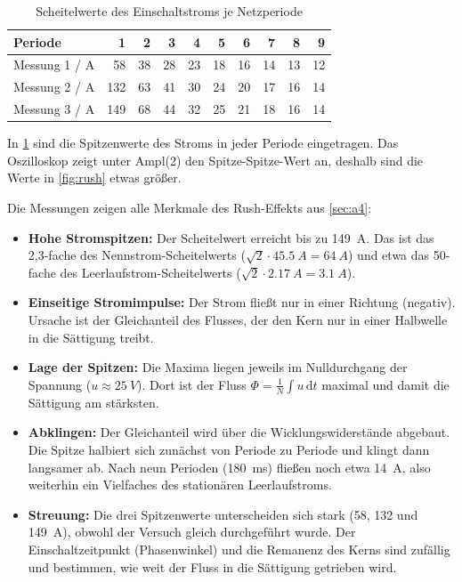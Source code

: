 \documentclass[a4paper,11pt]{scrreprt}
\begin{document}
\begin{table}[H]
\centering
\caption{Scheitelwerte des Einschaltstroms je Netzperiode}
\label{tab:rush}
\begin{tabular}{@{}lrrrrrrrrr@{}}
\toprule
Periode & 1 & 2 & 3 & 4 & 5 & 6 & 7 & 8 & 9\\
\midrule
Messung 1 / A & 58 & 38 & 28 & 23 & 18 & 16 & 14 & 13 & 12\\
Messung 2 / A & 132 & 63 & 41 & 30 & 24 & 20 & 17 & 16 & 14\\
Messung 3 / A & 149 & 68 & 44 & 32 & 25 & 21 & 18 & 16 & 14\\
\bottomrule
\end{tabular}
\end{table}

In \cref{tab:rush} sind die Spitzenwerte des Stroms in jeder Periode eingetragen. Das Oszilloskop zeigt unter \glqq Ampl(2)\grqq{} den Spitze-Spitze-Wert an, deshalb sind die Werte in \cref{fig:rush} etwas größer.

Die Messungen zeigen alle Merkmale des Rush-Effekts aus \cref{sec:a4}:
\begin{itemize}[nosep]
  \item \textbf{Hohe Stromspitzen:} Der Scheitelwert erreicht bis zu \SI{149}{A}. Das ist das 2,3-fache des Nennstrom-Scheitelwerts ($\sqrt2\cdot\SI{45.5}{A}=\SI{64}{A}$) und etwa das 50-fache des Leerlaufstrom-Scheitelwerts ($\sqrt2\cdot\SI{2.17}{A}=\SI{3.1}{A}$).
  \item \textbf{Einseitige Stromimpulse:} Der Strom fließt nur in einer Richtung (negativ). Ursache ist der Gleichanteil des Flusses, der den Kern nur in einer Halbwelle in die Sättigung treibt.
  \item \textbf{Lage der Spitzen:} Die Maxima liegen jeweils im Nulldurchgang der Spannung ($u\approx\SI{25}{V}$). Dort ist der Fluss $\Phi = \frac{1}{N}\int u\,\mathrm{d}t$ maximal und damit die Sättigung am stärksten.
  \item \textbf{Abklingen:} Der Gleichanteil wird über die Wicklungswiderstände abgebaut. Die Spitze halbiert sich zunächst von Periode zu Periode und klingt dann langsamer ab. Nach neun Perioden (\SI{180}{ms}) fließen noch etwa \SI{14}{A}, also weiterhin ein Vielfaches des stationären Leerlaufstroms.
  \item \textbf{Streuung:} Die drei Spitzenwerte unterscheiden sich stark (58, 132 und \SI{149}{A}), obwohl der Versuch gleich durchgeführt wurde. Der Einschaltzeitpunkt (Phasenwinkel) und die Remanenz des Kerns sind zufällig und bestimmen, wie weit der Fluss in die Sättigung getrieben wird.
\end{itemize}
\end{document}
